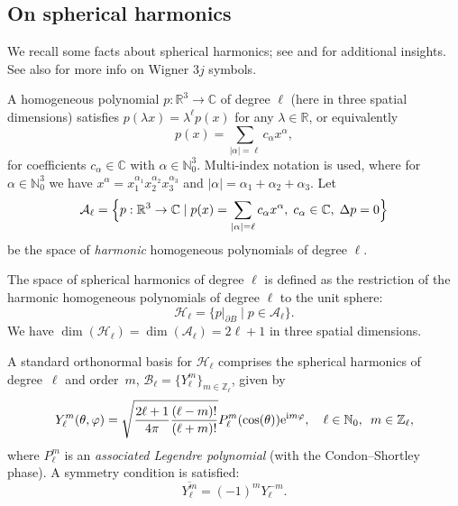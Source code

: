 \documentclass[reqno]{amsart}
\numberwithin{equation}{section}
\numberwithin{figure}{section}
\numberwithin{table}{section}
\theoremstyle{plain}
\theoremstyle{definition}
\theoremstyle{remark}
\newcommand{\abs}[1]{\lvert#1\rvert}
\newcommand{\I}{\mathrm{i}}    %
\newcommand{\e}{\mathrm{e}}    %
\newcommand{\R}{\mathbb{R}}
\newcommand{\N}{\mathbb{N}}
\newcommand{\C}{\mathbb{C}}
\newcommand{\Z}{\mathbb{Z}}
\begin{document}
\subsection{On spherical harmonics} 

We recall some facts about spherical harmonics; see \cite[Chapter~5]{Axler_2001} and \cite{Efthimiou_2014} for additional insights. See also \cite[§34]{NIST} for more info on Wigner $3j$ symbols.

A homogeneous polynomial $p:\R^3\to\C$ of degree $\ell$ (here in three spatial dimensions) satisfies $p(\lambda x) = \lambda^\ell p(x)$ for any $\lambda\in\R$, or equivalently
%
\begin{equation*}
    p(x) = \sum_{|\alpha| = \ell} c_\alpha x^\alpha,
\end{equation*}
%
for coefficients $c_\alpha\in \C$ with $\alpha\in \N_0^3$. Multi-index notation is used, where for $\alpha\in \N_0^3$ we have $x^\alpha = x_1^{\alpha_1} x_2^{\alpha_2} x_3^{\alpha_3}$ and $\abs{\alpha} = \alpha_1+\alpha_2+\alpha_3$. Let
%
\begin{equation*} 
    \mathcal{A}_\ell = \Bigl\{ p : \R^3 \to \C \mid p(x) = \sum_{|\alpha| = \ell} c_\alpha x^\alpha, \; c_\alpha \in \C, \; \Delta p = 0 \Bigr\}
\end{equation*}
%
be the space of \emph{harmonic} homogeneous polynomials of degree $\ell$. 

The space of spherical harmonics of degree $\ell$ is defined as the restriction of the harmonic homogeneous polynomials of degree $\ell$ to the unit sphere:
%
\begin{equation*} 
    \mathcal{H}_\ell = \{ p|_{\partial B} \mid p \in \mathcal{A}_\ell \}.
\end{equation*}
%
We have $\dim(\mathcal{H}_\ell) = \dim(\mathcal{A}_\ell) = 2\ell+1$ in three spatial dimensions.

A standard orthonormal basis for $\mathcal{H}_\ell$ comprises the spherical harmonics of degree~$\ell$ and order~$m$, $\mathcal{B}_\ell = \{Y_\ell^m\}_{m\in\Z_\ell}$, given by 
%
\begin{equation*}
    Y_\ell^m(\theta,\varphi) = \sqrt{\frac{2\ell+1}{4\pi}\frac{(\ell-m)!}{(\ell+m)!}}P^m_\ell(\cos(\theta))\e^{\I m\varphi}, \quad \ell\in\N_0, \enskip m\in\Z_\ell,
\end{equation*}
%
where $P_\ell^m$ is an \emph{associated Legendre polynomial} (with the Condon--Shortley phase). A symmetry condition is satisfied:
%
\begin{equation} \label{eq:conjsphharm}
    \overline{Y_\ell^m} = (-1)^m Y_\ell^{-m}.
\end{equation}
\end{document}
